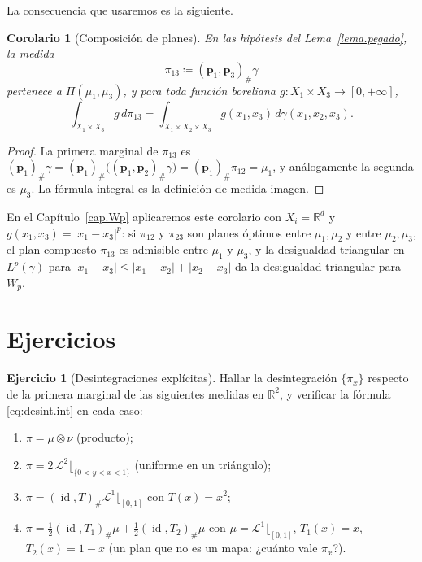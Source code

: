 \documentclass[12pt, a4paper]{amsbook}
\newcommand{\id}{\operatorname{id}}
\newcommand{\R}{{\mathbb R}}
\newcommand{\LL}{{\mathcal L}}
\newcommand{\pp}{{\mathbf p}}
\newtheorem{cor}[teo]{Corolario}
\theoremstyle{remark}
\theoremstyle{definition}
\newtheorem{ejercicio}{Ejercicio}[chapter]
\numberwithin{section}{chapter}
\numberwithin{subsection}{section}
\numberwithin{equation}{section}
\numberwithin{figure}{chapter}
\begin{document}
La consecuencia que usaremos es la siguiente.

\begin{cor}[Composición de planes]\label{cor.composicion.planes}
En las hipótesis del Lema~\ref{lema.pegado}, la medida
\[
\pi_{13}\coloneqq(\pp_1,\pp_3)_\#\gamma
\]
pertenece a $\Pi(\mu_1,\mu_3)$, y para toda función boreliana
$g\colon X_1\times X_3\to[0,+\infty]$,
\[
\int_{X_1\times X_3}g\,d\pi_{13}=\int_{X_1\times X_2\times X_3}g(x_1,x_3)\,d\gamma(x_1,x_2,x_3).
\]
\end{cor}

\begin{proof}
La primera marginal de $\pi_{13}$ es
$(\pp_1)_\#\gamma=(\pp_1)_\#\bigl((\pp_1,\pp_2)_\#\gamma\bigr)=(\pp_1)_\#\pi_{12}=\mu_1$,
y análogamente la segunda es $\mu_3$. La fórmula integral es la definición de
medida imagen.
\end{proof}

En el Capítulo~\ref{cap.Wp} aplicaremos este corolario con $X_i=\R^d$ y
$g(x_1,x_3)=|x_1-x_3|^p$: si $\pi_{12}$ y $\pi_{23}$ son planes óptimos entre
$\mu_1,\mu_2$ y entre $\mu_2,\mu_3$, el plan compuesto $\pi_{13}$ es admisible
entre $\mu_1$ y $\mu_3$, y la desigualdad triangular en $L^p(\gamma)$ para
$|x_1-x_3|\le|x_1-x_2|+|x_2-x_3|$ da la desigualdad triangular para $W_p$.


\section*{Ejercicios}

\begin{ejercicio}[Desintegraciones explícitas]\label{ejer.desint.ejemplos}
Hallar la desintegración $\{\pi_x\}$ respecto de la primera marginal de las
siguientes medidas en $\R^2$, y verificar la fórmula \eqref{eq:desint.int}
en cada caso:
\begin{enumerate}[label=(\alph*)]
\item $\pi=\mu\otimes\nu$ (producto);
\item $\pi=2\,\LL^2\lfloor_{\{0<y<x<1\}}$ (uniforme en un triángulo);
\item $\pi=(\id,T)_\#\LL^1\lfloor_{[0,1]}$ con $T(x)=x^2$;
\item $\pi=\frac12(\id,T_1)_\#\mu+\frac12(\id,T_2)_\#\mu$ con
$\mu=\LL^1\lfloor_{[0,1]}$, $T_1(x)=x$, $T_2(x)=1-x$ (un plan que no es un
mapa: ¿cuánto vale $\pi_x$?).
\end{enumerate}
\end{ejercicio}
\end{document}
